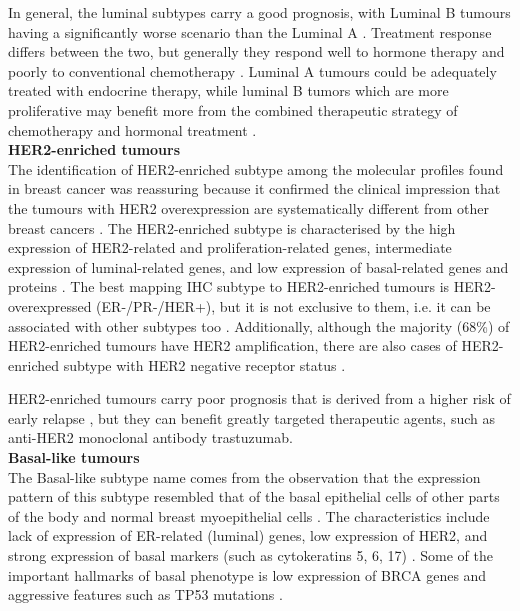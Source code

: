 In general, the luminal subtypes carry a good prognosis, with Luminal B tumours having a significantly worse scenario than the Luminal A \cite{Srlie2003RepeatedSets}. Treatment response differs between the two, but generally they respond well to hormone therapy and poorly to conventional chemotherapy \cite{brenton2005molecular}. Luminal A tumours could be adequately treated with endocrine therapy, while luminal B tumors which are more proliferative may benefit more from the combined therapeutic strategy of chemotherapy and hormonal treatment \cite{paik2004multigene}.\\


\textbf{HER2-enriched tumours}\\
The identification of HER2-enriched subtype among the molecular profiles found in breast cancer was reassuring because it confirmed the clinical impression that the tumours with HER2 overexpression are systematically different from other breast cancers \cite{brenton2005molecular}. 
The HER2-enriched subtype is characterised by the high expression of HER2-related and proliferation-related genes, intermediate expression of luminal-related genes, and low expression of basal-related genes and proteins \cite{Vidal2017}. The best mapping IHC subtype to HER2-enriched tumours is HER2-overexpressed  (ER-/PR-/HER+), but it is not exclusive to them, i.e. it can be associated with other subtypes too \cite{Dai2015}. Additionally, although the majority (68\%) of HER2-enriched tumours have HER2 amplification, there are also cases of HER2-enriched subtype with HER2 negative receptor status \cite{Vidal2017}.

HER2-enriched tumours carry poor prognosis that is derived from a higher risk of early relapse \cite{carey2007triple}, but they can benefit greatly targeted therapeutic agents, such as anti-HER2 monoclonal antibody trastuzumab. \\


\textbf{Basal-like tumours}\\
The Basal-like subtype name comes from the observation that the expression pattern of this subtype resembled that of the basal epithelial cells of other parts of the body and normal breast myoepithelial cells \cite{perou2000molecular, brenton2005molecular}. The characteristics include lack of expression of ER-related (luminal) genes, low expression of HER2, and strong expression of basal markers (such as cytokeratins 5, 6, 17) \cite{sotiriou2003breast}. Some of the important hallmarks of basal phenotype is low expression of BRCA genes \cite{callagy2003molecular} and aggressive features such as TP53 mutations \cite{Srlie2001GeneImplications}. 

